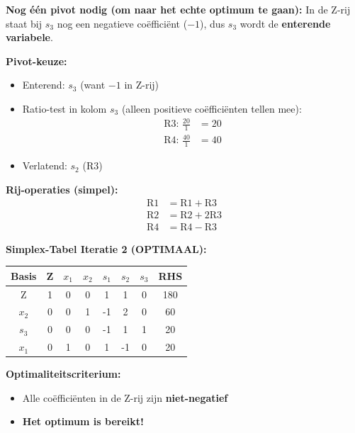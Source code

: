\documentclass[a4paper,11pt]{article}
\begin{document}
\begin{oefenblok}[title=Lineair Programmeren — De Ambachtelijke Werkplaats]
	\textbf{Nog één pivot nodig (om naar het echte optimum te gaan):}
In de Z-rij staat bij $s_3$ nog een negatieve coëfficiënt ($-1$), dus $s_3$ wordt de \textbf{enterende variabele}.

	\textbf{Pivot-keuze:}
\begin{itemize}
    \item Enterend: $s_3$ (want $-1$ in Z-rij)
    \item Ratio-test in kolom $s_3$ (alleen positieve coëfficiënten tellen mee):
    \begin{align*}
    	\text{R3: } \frac{20}{1} &= 20 \\
    	\text{R4: } \frac{40}{1} &= 40
    \end{align*}
    \item Verlatend: $s_{2}$ (R3)
\end{itemize}

	\textbf{Rij-operaties (simpel):}
\begin{align*}
	\text{R1} &= \text{R1} + \text{R3} \\
	\text{R2} &= \text{R2} + 2\text{R3} \\
	\text{R4} &= \text{R4} - \text{R3}
\end{align*}

\vspace{0.3cm}

\textbf{Simplex-Tabel Iteratie 2 (OPTIMAAL):}

\vspace{0.3cm}

\begin{center}
\begin{tabular}{|c|c|c|c|c|c|c|c|}
\hline
\textbf{Basis} & \textbf{Z} & \textbf{$x_1$} & \textbf{$x_2$} & \textbf{$s_1$} & \textbf{$s_2$} & \textbf{$s_3$} & \textbf{RHS} \\
\hline
Z & 1 & 0 & 0 & 1 & 1 & 0 & 180 \\
\hline
$x_2$ & 0 & 0 & 1 & -1 & 2 & 0 & 60 \\
\hline
$s_3$ & 0 & 0 & 0 & -1 & 1 & 1 & 20 \\
\hline
$x_1$ & 0 & 1 & 0 & 1 & -1 & 0 & 20 \\
\hline
\end{tabular}
\end{center}
\FloatBarrier

\textbf{Optimaliteitscriterium:}
\begin{itemize}
    \item Alle coëfficiënten in de Z-rij zijn \textbf{niet-negatief}
    \item \textbf{Het optimum is bereikt!}
\end{itemize}


\end{oefenblok}
\end{document}
